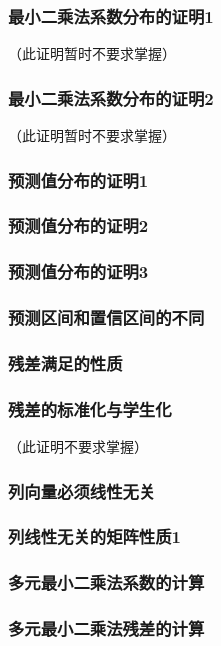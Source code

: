 \documentclass[UTF8]{ctexart}
\begin{document}
\subsubsection{最小二乘法系数分布的证明1}
\label{proof19}
（此证明暂时不要求掌握）

\subsubsection{最小二乘法系数分布的证明2}
\label{proof20}
（此证明暂时不要求掌握）

\subsubsection{预测值分布的证明1}
\label{proof21}

\subsubsection{预测值分布的证明2}
\label{proof22}

\subsubsection{预测值分布的证明3}
\label{proof23}

\subsubsection{预测区间和置信区间的不同}
\label{proof24}

\subsubsection{残差满足的性质}
\label{proof25}

\subsubsection{残差的标准化与学生化}
\label{proof26}
（此证明不要求掌握）

\subsubsection{列向量必须线性无关}
\label{proof27}

\subsubsection{列线性无关的矩阵性质1}
\label{proof28}

\subsubsection{多元最小二乘法系数的计算}
\label{proof29}

\subsubsection{多元最小二乘法残差的计算}
\label{proof30}
\end{document}
